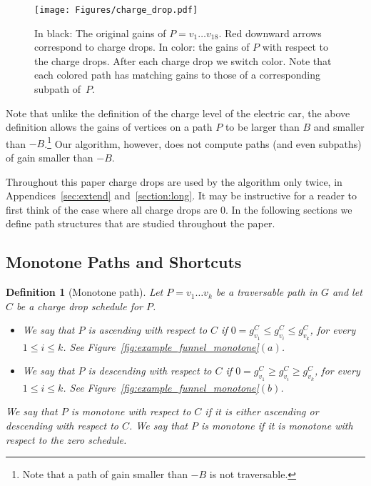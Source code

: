 \documentclass[11pt]{article}
\newtheorem{definition}[theorem]{Definition}
\begin{document}
\begin{figure}[t]
    \centering
    \texttt{[image: Figures/charge\_drop.pdf]}
    \caption{
    In black: The original gains of $P=v_1\ldots v_{18}$. Red downward arrows correspond to charge drops. In color: the gains of $P$ with respect to the charge drops. After each charge drop we switch color. Note that each colored path has matching gains to those of a corresponding subpath of~$P$.}
    \label{fig:example_charge_drop}
\end{figure}

Note that unlike the definition of the charge level of the electric car, the above definition allows the gains of vertices on a path $P$ to be larger than $B$ and smaller than $-B$.\footnote{Note that a path of gain smaller than $-B$ is not traversable.} 
Our algorithm, however, does not 
compute paths (and even subpaths) of gain smaller than $-B$.


Throughout this paper charge drops are used by the algorithm only twice, in Appendices~\ref{sec:extend} and~\ref{section:long}. 
It may be instructive for a reader to first think of 
the case where all charge drops are $0$. In the following sections we define path structures that are studied throughout the paper.

\subsection{Monotone Paths and Shortcuts}

\begin{definition}[Monotone path]\label{def:monotone-path}
    Let $P=v_1\ldots v_k$ be a traversable path in $G$ and let $C$ be a charge drop schedule for $P$.
    \begin{itemize}
        \item We say that $P$ is ascending with respect to $C$ if $0 = g^{C}_{v_1} \le g^C_{v_i} \le g^C_{v_k}$, for every $1\le i\le k$. See Figure~\ref{fig:example_funnel_monotone}$(a)$.
        \item We say that $P$ is descending with respect to $C$ if $0 = g^C_{v_1} \ge g^C_{v_i} \ge g^C_{v_k}$, for every $1\le i\le k$. See Figure~\ref{fig:example_funnel_monotone}$(b)$.
    \end{itemize}
    We say that $P$ is monotone with respect to $C$ if it is either ascending or descending with respect to $C$. We say that $P$ is monotone if it is monotone with respect to the zero schedule.
\end{definition}
\end{document}
